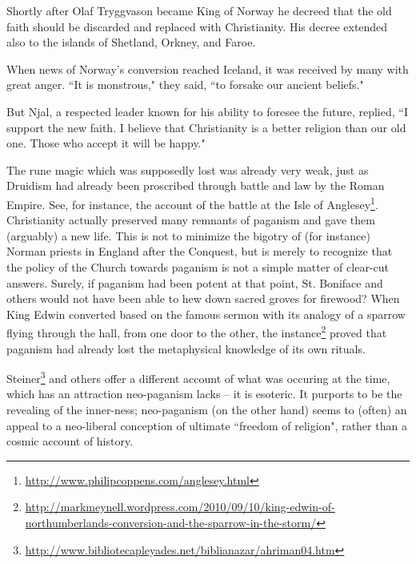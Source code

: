 \begin{quotex}
Shortly after Olaf Tryggvason became King of Norway he decreed that the old faith should be discarded and replaced with Christianity. His decree extended also to the islands of Shetland, Orkney, and Faroe.

When news of Norway's conversion reached Iceland, it was received by many with great anger. ``It is monstrous," they said, ``to forsake our ancient beliefs."

But Njal, a respected leader known for his ability to foresee the future, replied, ``I support the new faith. I believe that Christianity is a better religion than our old one. Those who accept it will be happy."

\end{quotex}
The rune magic which was supposedly lost was already very weak, just as Druidism had already been proscribed through battle and law by the Roman Empire. See, for instance, the account of the battle at the Isle of Anglesey\footnote{\url{http://www.philipcoppens.com/anglesey.html}}. Christianity actually preserved many remnants of paganism and gave them (arguably) a new life. This is not to minimize the bigotry of (for instance) Norman priests in England after the Conquest, but is merely to recognize that the policy of the Church towards paganism is not a simple matter of clear-cut answers. Surely, if paganism had been potent at that point, St. Boniface and others would not have been able to hew down sacred groves for firewood? When King Edwin converted based on the famous sermon with its analogy of a sparrow flying through the hall, from one door to the other, the instance\footnote{\url{http://markmeynell.wordpress.com/2010/09/10/king-edwin-of-northumberlands-conversion-and-the-sparrow-in-the-storm/}} proved that paganism had already lost the metaphysical knowledge of its own rituals.

Steiner\footnote{\url{http://www.bibliotecapleyades.net/biblianazar/ahriman04.htm}} and others offer a different account of what was occuring at the time, which has an attraction neo-paganism lacks – it is esoteric. It purports to be the revealing of the inner-ness; neo-paganism (on the other hand) seems to (often) an appeal to a neo-liberal conception of ultimate ``freedom of religion", rather than a cosmic account of history.


